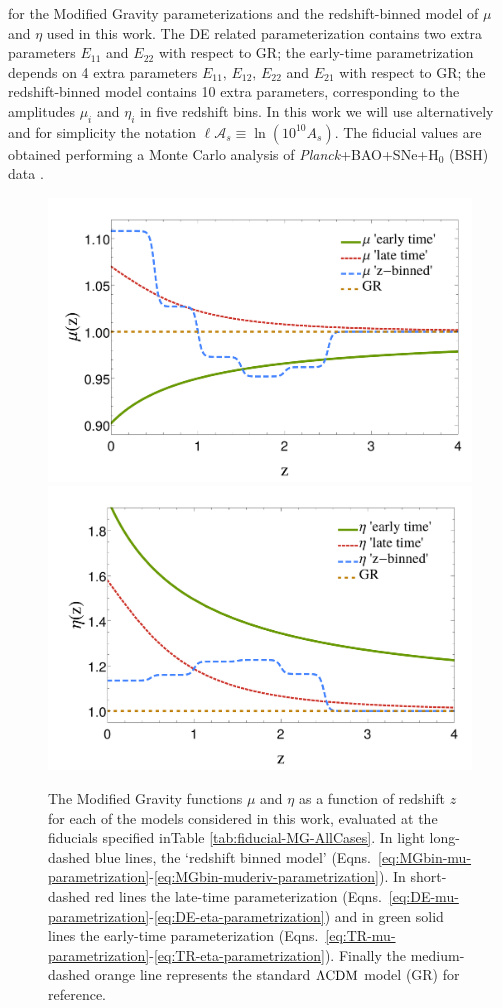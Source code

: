 \begin{table}[htbp]
{for the Modified
Gravity parameterizations and the redshift-binned model of $\mu$
and $\eta$ used in this work. The DE related parameterization contains
two extra parameters $E_{11}$ and $E_{22}$ with respect to GR; the
early-time parametrization depends on 4 extra parameters
$E_{11},\,E_{12},\,E_{22}$
and $E_{21}$ with respect to GR; the redshift-binned model contains
10 extra parameters, corresponding to the amplitudes $\mu_{i}$ and
$\eta_{i}$ in five redshift bins. In this work we will
use alternatively and for simplicity the notation $\ell \mathcal{A}_s \equiv \ln(10^{10} A_{s})$.
The fiducial values are obtained
performing a Monte Carlo analysis of {\it Planck}+BAO+SNe+H$_{0}$ (BSH) data
\cite{planck_collaboration_planck_2016}.}
\label{tab:DEfid} 
\end{table}


\begin{figure}[htbp]
	\centering{}\begin{center}
		\includegraphics[width=0.45\linewidth]{Chapters/linear-nonlinear-MG-forecasts/figures/fiducials/muFiducialsPlot}
		\includegraphics[width=0.45\linewidth]{Chapters/linear-nonlinear-MG-forecasts/figures/fiducials/etaFiducialsPlot}
	\end{center}
	\caption[Modified Gravity functions $\eta$ and $\mu$.]{\label{fig:fidplot}
The Modified Gravity functions $\mu$ and $\eta$ as a function of redshift $z$ for each of the models considered in this work, evaluated at the fiducials specified inTable \ref{tab:fiducial-MG-AllCases}. 
In light long-dashed blue lines, the `redshift binned model' (Eqns.\ \ref{eq:MGbin-mu-parametrization}-\ref{eq:MGbin-muderiv-parametrization}). In short-dashed red lines the late-time parameterization (Eqns.\ \ref{eq:DE-mu-parametrization}-\ref{eq:DE-eta-parametrization}) and in green solid lines the early-time parameterization (Eqns.\ \ref{eq:TR-mu-parametrization}-\ref{eq:TR-eta-parametrization}). Finally the medium-dashed orange line represents the standard $\Lambda\mathrm{CDM}$ model (GR) for reference.
		}
\end{figure}







